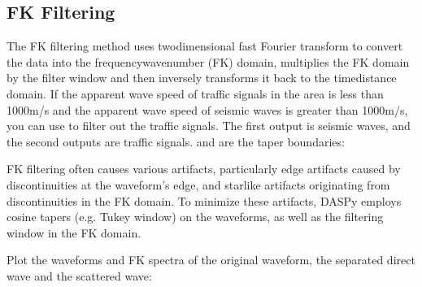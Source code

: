 \documentclass[letterpaper,10pt,english]{sphinxmanual}
\begin{document}
\subsection{FK Filtering}
\label{\detokenize{Wavefield Decomposition:fk-filtering}}\label{\detokenize{Wavefield Decomposition:id1}}
\sphinxAtStartPar
The FK filtering method uses two\sphinxhyphen{}dimensional fast Fourier transform to convert the data into the frequency\sphinxhyphen{}wavenumber (FK) domain, multiplies the FK domain by the filter window and then inversely transforms it back to the time\sphinxhyphen{}distance domain. If the apparent wave speed of traffic signals in the area is less than 1000m/s and the apparent wave speed of seismic waves is greater than 1000m/s, you can use  to filter out the traffic signals. The first output is seismic waves, and the second outputs are traffic signals.  and  are the taper boundaries:

\begin{sphinxVerbatim}[commandchars=\\\{\}]
     
\end{sphinxVerbatim}

\sphinxAtStartPar
FK filtering often causes various artifacts, particularly edge artifacts caused by discontinuities at the waveform’s edge, and star\sphinxhyphen{}like artifacts originating from discontinuities in the FK domain. To minimize these artifacts, DASPy employs cosine tapers (e.g. Tukey window) on the waveforms, as well as the filtering window in the FK domain.

\sphinxAtStartPar
Plot the waveforms and FK spectra of the original waveform, the separated direct wave and the scattered wave:
\end{document}
